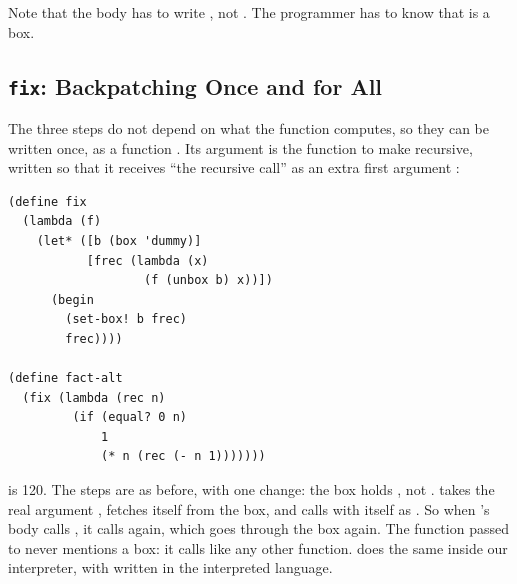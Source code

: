 Note that the body has to write , not . The programmer has to know that  is a box.

\subsection{\texttt{fix}: Backpatching Once and for All}

The three steps do not depend on what the function computes, so they can be written once, as a function . Its argument  is the function to make recursive, written so that it receives ``the recursive call'' as an extra first argument :
\begin{lstlisting}
(define fix
  (lambda (f)
    (let* ([b (box 'dummy)]
           [frec (lambda (x)
                   (f (unbox b) x))])
      (begin
        (set-box! b frec)
        frec))))

(define fact-alt
  (fix (lambda (rec n)
         (if (equal? 0 n)
             1
             (* n (rec (- n 1)))))))
\end{lstlisting}
 is 120. The steps are as before, with one change: the box holds , not .  takes the real argument , fetches itself from the box, and calls  with itself as . So when 's body calls , it calls  again, which goes through the box again. The function passed to  never mentions a box: it calls  like any other function.  does the same inside our interpreter, with  written in the interpreted language.
